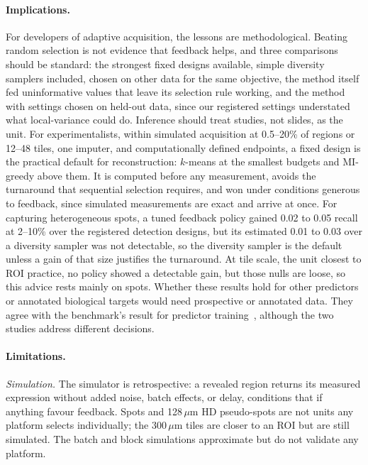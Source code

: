 \documentclass[10pt]{article}
\begin{document}
\paragraph{Implications.} For developers of adaptive acquisition, the lessons are methodological. Beating random
selection is not evidence that feedback helps, and three comparisons should be standard: the strongest fixed designs available, simple diversity samplers included,
chosen on other data for the same objective, the method itself fed uninformative values that leave its selection rule
working, and the method with settings chosen on held-out data, since our registered settings understated what
local-variance could do. Inference should treat studies, not slides, as the unit. For experimentalists, within
simulated acquisition at 0.5--20\% of regions or 12--48 tiles, one imputer, and computationally defined endpoints, a
fixed design is the practical default for reconstruction: $k$-means at the smallest budgets and MI-greedy above
them. It is computed before any measurement, avoids the turnaround that sequential selection requires, and won
under conditions generous to feedback, since simulated measurements are exact and arrive at once. For capturing
heterogeneous spots, a tuned feedback policy gained 0.02 to 0.05 recall at 2--10\% over the registered
detection designs, but its estimated 0.01 to 0.03 over a diversity sampler was not detectable, so the diversity
sampler is the default unless a gain of that size justifies the turnaround. At tile scale, the unit closest to ROI
practice, no policy showed a detectable gain, but those nulls are loose, so this advice rests mainly on spots. Whether these results hold for other predictors or annotated
biological targets would need prospective or annotated data. They agree with the benchmark's result for predictor
training~\citep{zhu2026benchmarking}, although the two studies address different decisions.

\paragraph{Limitations.} \emph{Simulation.} The simulator is retrospective: a revealed region returns its measured
expression without added noise, batch effects, or delay, conditions that if anything favour feedback. Spots and
128\,$\mu$m HD pseudo-spots are not units any platform selects individually; the 300\,$\mu$m tiles are closer to an
ROI but are still simulated. The batch and block simulations approximate but do not validate any platform.
\end{document}
